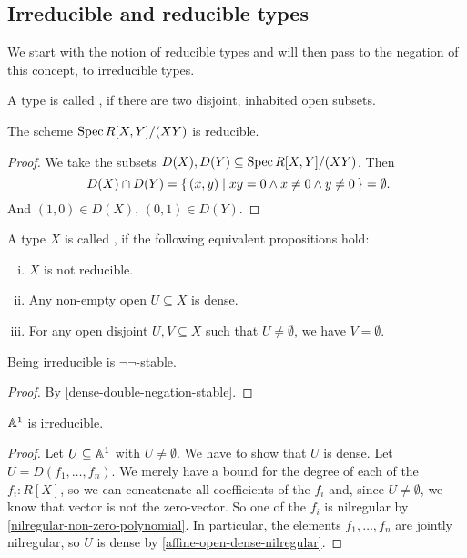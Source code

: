 \subsection{Irreducible and reducible types}

We start with the notion of reducible types and will then pass to the negation of this concept, to irreducible types.

\begin{definition}
  A type is called , if there are two disjoint, inhabited open subsets.
\end{definition}

\begin{proposition}
  The scheme $\operatorname{Spec} R[X,Y]/(XY)$ is reducible.
\end{proposition}

\begin{proof}
  We take the subsets $D(X),D(Y)\subseteq \operatorname{Spec} R[X,Y]/(XY)$.
  Then
  \[ D(X)\cap D(Y)=\{\,(x,y)\mid xy=0\wedge x\neq 0\wedge y\neq 0\,\}=\emptyset\rlap{.} \]
  And $(1,0)\in D(X)$, $(0,1)\in D(Y)$.
\end{proof}

\begin{definition}%
  \label{irred}
  A type $X$ is called ,
  if the following equivalent propositions hold:
  \begin{enumerate}[(i)]
  \item $X$ is not reducible.
  \item Any non-empty open $U\subseteq X$ is dense.
  \item For any open disjoint $U,V\subseteq X$ such that $U\neq\emptyset$, we have $V=\emptyset$.
  \end{enumerate}
\end{definition}

\begin{proposition}%
  \label{irred-double-negation-stable}
  Being irreducible is $\neg\neg$-stable.
\end{proposition}

\begin{proof}
  By \cref{dense-double-negation-stable}.  
\end{proof}

\begin{proposition}%
  \label{A1-irreducible}
  $\mathbb{A}^1$ is irreducible.
\end{proposition}

\begin{proof}
  Let $U\subseteq \mathbb{A}^1$ with $U\neq \emptyset$.
  We have to show that $U$ is dense.
  Let $U=D(f_1,\dots,f_n)$.
  We merely have a bound for the degree of each of the $f_i:R[X]$,
  so we can concatenate all coefficients of the $f_i$ and, since $U\neq \emptyset$,
  we know that vector is not the zero-vector.
  So one of the $f_i$ is nilregular by \cref{nilregular-non-zero-polynomial}.
  In particular,
  the elements $f_1, \dots, f_n$ are jointly nilregular,
  so $U$ is dense by \cref{affine-open-dense-nilregular}.
\end{proof}


